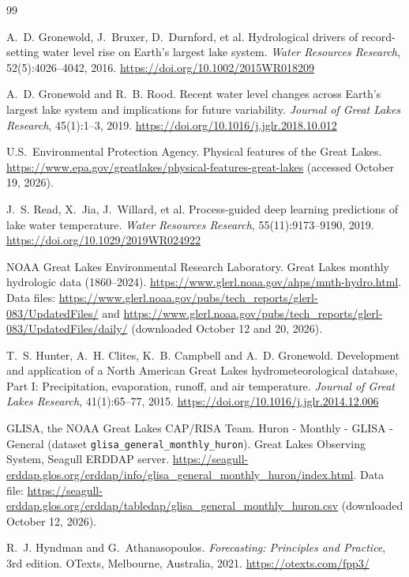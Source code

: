 \documentclass{article}
\begin{document}
\begin{thebibliography}{99}
\raggedright

A.~D. Gronewold, J.~Bruxer, D.~Durnford, et al. Hydrological drivers of record-setting water
level rise on Earth's largest lake system. \emph{Water Resources Research}, 52(5):4026--4042,
2016. \url{https://doi.org/10.1002/2015WR018209}

A.~D. Gronewold and R.~B. Rood. Recent water level changes across Earth's largest lake system
and implications for future variability. \emph{Journal of Great Lakes Research}, 45(1):1--3,
2019. \url{https://doi.org/10.1016/j.jglr.2018.10.012}

U.S.\ Environmental Protection Agency. Physical features of the Great Lakes.
\url{https://www.epa.gov/greatlakes/physical-features-great-lakes} (accessed October 19, 2026).

J.~S. Read, X.~Jia, J.~Willard, et al. Process-guided deep learning predictions of lake water
temperature. \emph{Water Resources Research}, 55(11):9173--9190, 2019.
\url{https://doi.org/10.1029/2019WR024922}

NOAA Great Lakes Environmental Research Laboratory. Great Lakes monthly hydrologic data
(1860--2024). \url{https://www.glerl.noaa.gov/ahps/mnth-hydro.html}. Data files:
\url{https://www.glerl.noaa.gov/pubs/tech_reports/glerl-083/UpdatedFiles/} and
\url{https://www.glerl.noaa.gov/pubs/tech_reports/glerl-083/UpdatedFiles/daily/} (downloaded
October 12 and 20, 2026).

T.~S. Hunter, A.~H. Clites, K.~B. Campbell and A.~D. Gronewold. Development and application of
a North American Great Lakes hydrometeorological database, Part I: Precipitation, evaporation,
runoff, and air temperature. \emph{Journal of Great Lakes Research}, 41(1):65--77, 2015.
\url{https://doi.org/10.1016/j.jglr.2014.12.006}

GLISA, the NOAA Great Lakes CAP/RISA Team. Huron - Monthly - GLISA - General (dataset
\texttt{glisa\_general\_monthly\_huron}). Great Lakes Observing System, Seagull ERDDAP server.
\url{https://seagull-erddap.glos.org/erddap/info/glisa_general_monthly_huron/index.html}. Data
file: \url{https://seagull-erddap.glos.org/erddap/tabledap/glisa_general_monthly_huron.csv}
(downloaded October 12, 2026).

R.~J. Hyndman and G.~Athanasopoulos. \emph{Forecasting: Principles and Practice}, 3rd edition.
OTexts, Melbourne, Australia, 2021. \url{https://otexts.com/fpp3/}


\end{thebibliography}
\end{document}
